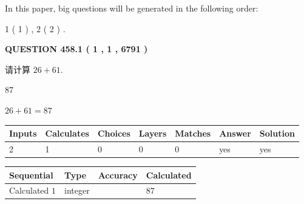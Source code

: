 \documentclass{ctexart}
\begin{document}
   
   
\vspace{0.2in}
   
In this paper, big questions will be generated in the following order: 
   
   
   1 ( 1 )
 ,
   2 ( 2 )
 .
  
\vspace{0.2in}
  
{\textbf{\Large{QUESTION
458.1 
 ( 1 , 1 , 6791 )
}}}
  
  
 
请计算 $ %
26 +  %
61 $.
 
 
 
\noindent{}
 
 

87
 
 
\noindent{}
 
 

 
 
 
\noindent{}
 
 

$ %
26 +  %
61=   %
87$
 
 
\noindent{}
 
 

 
   
   
   
   
\noindent\begin{tabular}{|l|l|l|l|l|l|l|}
 \hline
Inputs & Calculates & Choices & Layers & Matches & Answer & Solution \\ \hline
 2  & 
 1  & 
 0
  & 
 0  & 
 0  & 
  yes & 
  yes 
  \\ \hline
 \end{tabular}
   
   
   
   
\noindent{}
   
   
  
  
\noindent\begin{tabular}{|l|l|l|l|}
\hline
 Sequential & Type & Accuracy & Calculated \\ 
\hline
 
 
  Calculated $  1 $ & integer &  & 
  $ 87 $ 
 \\  \hline  
 \end{tabular}
   
\end{document}
